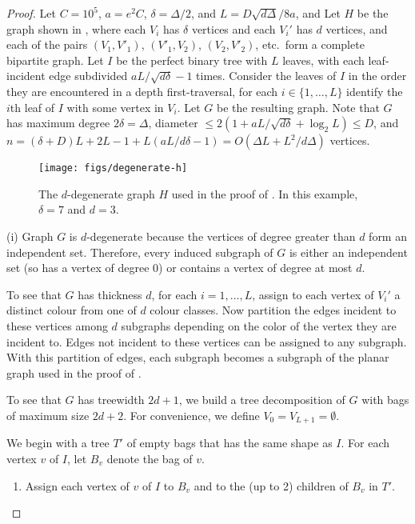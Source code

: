 \documentclass{patmorin}
\begin{document}
\begin{proof}
Let $C =10^5$, $a=e^2C$, 
$\delta=\Delta/2$, and 
$L=D\sqrt{d\Delta}/8a$, and 
Let $H$ be the graph shown in ,
where each $V_i$ has $\delta$ vertices
  and each $V_i'$ has $d$ vertices,
  and each of the pairs
  $(V_1,V'_1)$, $(V'_1,V_2)$, $(V_2,V'_2)$, etc.\ form a complete bipartite graph.
Let $I$ be the perfect binary tree with $L$ leaves,
with each leaf-incident edge subdivided $aL/\sqrt{d\delta}-1$ times.
Consider the leaves of
$I$ in the order they are encountered in a depth first-traversal, for each $i\in\{1,\ldots,L\}$ identify the $i$th leaf of $I$
with some vertex in $V_i$. 
Let $G$ be the resulting graph.
Note that $G$ has maximum degree $2\delta=\Delta$,
diameter $\leq 2(1+aL/\sqrt{d\delta}+\log_2 L)\leq D$,
and $n=(\delta+D)L+2L-1+L(aL/d\delta-1)=O(\Delta L + L^2/d\Delta)$ vertices.
 
  \begin{figure}
    \begin{center}
       \texttt{[image: figs/degenerate-h]}
    \end{center}
    \caption{The $d$-degenerate graph $H$ used in the proof of
       . In this example, $\delta=7$
        and $d=3$.}
  \end{figure}
  
(i)
  Graph $G$ is $d$-degenerate because the vertices of degree greater
  than $d$ form an independent set. Therefore, every induced subgraph
  of $G$ is either an independent set (so has a vertex of degree 0)
  or contains a vertex of degree at most $d$.

  To see that $G$ has thickness $d$, 
  for each $i=1,\dots,L$, assign to each vertex of 
  $V_{i}'$ a distinct colour from one of $d$ colour classes.   Now partition the edges incident to
  these vertices among $d$ subgraphs depending on the color of the
  vertex they are incident to.  Edges not incident to these vertices
  can be assigned to any subgraph.  With this partition of edges, each
  subgraph becomes a subgraph of the planar graph used in the proof of
  .

  To see that $G$ has treewidth $2d+1$, we build a tree decomposition
  of $G$ with bags of maximum size $2d+2$.  For convenience, we 
  define $V_0=V_{L+1}=\emptyset$.

  We begin with a tree $T'$ of empty bags that has the same shape as $I$. For each vertex $v$ of $I$, let $B_v$ denote the bag of $v$.
  \begin{enumerate}
    \item Assign each vertex of $v$ of $I$ to $B_v$ and to the (up to 2)
      children of $B_v$ in $T'$.


\end{enumerate}
\end{proof}
\end{document}
